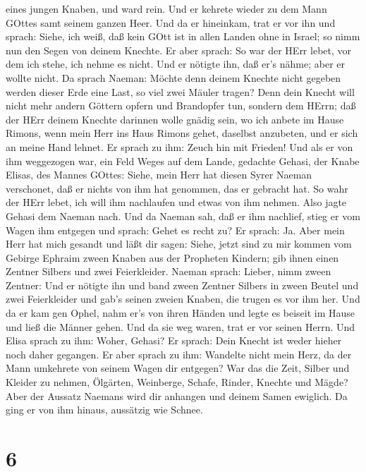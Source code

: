 eines jungen Knaben, und ward rein.  Und er kehrete wieder
zu dem Mann GOttes samt seinem ganzen Heer. Und da er hineinkam, trat er
vor ihn und sprach: Siehe, ich weiß, daß kein GOtt ist in allen Landen
ohne in Israel; so nimm nun den Segen von deinem Knechte. 
Er aber sprach: So war der HErr lebet, vor dem ich stehe, ich nehme es
nicht. Und er nötigte ihn, daß er's nähme; aber er wollte nicht.
 Da sprach Naeman: Möchte denn deinem Knechte nicht gegeben
werden dieser Erde eine Last, so viel zwei Mäuler tragen? Denn dein
Knecht will nicht mehr andern Göttern opfern und Brandopfer tun, sondern
dem HErrn;  daß der HErr deinem Knechte darinnen wolle
gnädig sein, wo ich anbete im Hause Rimons, wenn mein Herr ins Haus
Rimons gehet, daselbst anzubeten, und er sich an meine Hand lehnet.
 Er sprach zu ihm: Zeuch hin mit Frieden! Und als er von
ihm weggezogen war, ein Feld Weges auf dem Lande,  gedachte
Gehasi, der Knabe Elisas, des Mannes GOttes: Siehe, mein Herr hat diesen
Syrer Naeman verschonet, daß er nichts von ihm hat genommen, das er
gebracht hat. So wahr der HErr lebet, ich will ihm nachlaufen und etwas
von ihm nehmen.  Also jagte Gehasi dem Naeman nach. Und da
Naeman sah, daß er ihm nachlief, stieg er vom Wagen ihm entgegen und
sprach: Gehet es recht zu?  Er sprach: Ja. Aber mein Herr
hat mich gesandt und läßt dir sagen: Siehe, jetzt sind zu mir kommen vom
Gebirge Ephraim zween Knaben aus der Propheten Kindern; gib ihnen einen
Zentner Silbers und zwei Feierkleider.  Naeman sprach:
Lieber, nimm zween Zentner: Und er nötigte ihn und band zween Zentner
Silbers in zween Beutel und zwei Feierkleider und gab's seinen zweien
Knaben, die trugen es vor ihm her.  Und da er kam gen
Ophel, nahm er's von ihren Händen und legte es beiseit im Hause und ließ
die Männer gehen.  Und da sie weg waren, trat er vor seinen
Herrn. Und Elisa sprach zu ihm: Woher, Gehasi? Er sprach: Dein Knecht
ist weder hieher noch daher gegangen.  Er aber sprach zu
ihm: Wandelte nicht mein Herz, da der Mann umkehrete von seinem Wagen
dir entgegen? War das die Zeit, Silber und Kleider zu nehmen, Ölgärten,
Weinberge, Schafe, Rinder, Knechte und Mägde?  Aber der
Aussatz Naemans wird dir anhangen und deinem Samen ewiglich. Da ging er
von ihm hinaus, aussätzig wie Schnee.

\hypertarget{section-5}{%
\section{6}\label{section-5}}


